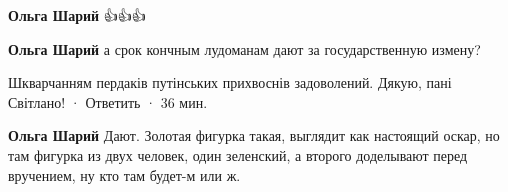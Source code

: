 \begin{itemize}
\begin{itemize}
 
\textbf{Ольга Шарий} 👍👍👍

 
\textbf{Ольга Шарий} а срок кончным лудоманам дают за государственную измену?

 
Шкварчанням пердаків путінських прихвоснів задоволений. Дякую, пані Світлано!
 · Ответить · 36 мин.
 
\textbf{Ольга Шарий} Дают. Золотая фигурка такая, выглядит как настоящий оскар, но там фигурка из двух человек, один зеленский, а второго доделывают перед вручением, ну кто там будет-м или ж.

\end{itemize}
\end{itemize}

